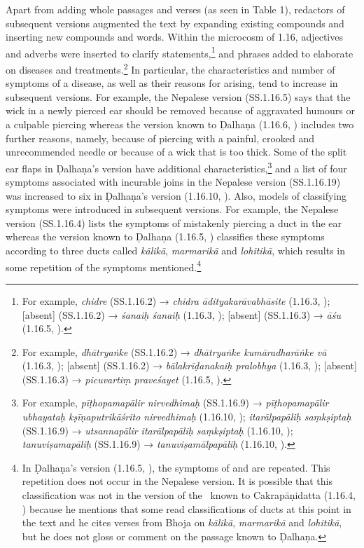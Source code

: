 Apart from adding whole passages and verses (as seen in Table 1), redactors of subsequent versions augmented the text by expanding existing compounds and inserting new compounds and words. Within the microcosm of 1.16, adjectives and adverbs were inserted to clarify statements,\footnote{For example, \emph{chidre} (SS.1.16.2) → \emph{chidra ādityakarāvabhāsite} (1.16.3, \cite[76]{vulgate}); [absent] (SS.1.16.2) → \emph{śanaiḥ śanaiḥ} (1.16.3, \cite[76]{vulgate});  [absent] (SS.1.16.3) → \emph{āśu} (1.16.5, \cite[77]{vulgate}).} and phrases added to elaborate on diseases and treatments.\footnote{For example, \emph{dhātryaṅke} (SS.1.16.2) → \emph{dhātryaṅke kumāradharāṅke vā} (1.16.3, \cite[76]{vulgate}); [absent] (SS.1.16.2) → \emph{bālakrīḍanakaiḥ pralobhya} (1.16.3, \cite[76]{vulgate});  [absent] (SS.1.16.3) → \emph{picuvartiṃ praveśayet} (1.16.5, \cite[77]{vulgate}).} In particular, the characteristics and number of symptoms of a disease, as well as their reasons for arising, tend to increase in subsequent versions. For example, the Nepalese version (SS.1.16.5) says that the wick in a newly pierced ear should be removed because of aggravated humours or a culpable piercing whereas the version known to Ḍalhaṇa (1.16.6, \cite[77]{vulgate}) includes two further reasons, namely, because of piercing with a painful, crooked and unrecommended needle or because of a wick that is too thick. Some of the split ear flaps in Ḍalhaṇa's version have additional characteristics,\footnote{For example, \emph{pīṭhopamapālir nirvedhimaḥ} (SS.1.16.9) → \emph{pīṭhopamapālir ubhayataḥ kṣīṇaputrikāśrito nirvedhimaḥ} (1.16.10, \cite[77]{vulgate}); \emph{itarālpapāliḥ saṃkṣiptaḥ} (SS.1.16.9) → \emph{utsannapālir itarālpapāliḥ saṃkṣiptaḥ} (1.16.10, \cite[77]{vulgate}); \emph{tanuviṣamapāliḥ} (SS.1.16.9) → \emph{tanuviṣamālpapāliḥ} (1.16.10, \cite[77]{vulgate}).} and a list of four symptoms associated with incurable joins in the Nepalese version (SS.1.16.19) was increased to six in Ḍalhaṇa's version (1.16.10, \cite[77]{vulgate}). Also, models of classifying symptoms were introduced in subsequent versions. For example, the Nepalese version (SS.1.16.4) lists the symptoms of mistakenly piercing a duct in the ear whereas the version known to Ḍalhaṇa (1.16.5, \cite[76–77]{vulgate}) classifies these symptoms according to three ducts called \emph{kālikā}, \emph{marmarikā} and \emph{lohitikā}, which results in some repetition of the symptoms mentioned.\footnote{In Ḍalhaṇa's version  (1.16.5, \cite[76–77]{vulgate}), the symptoms of  and  are repeated. This repetition does not occur in the Nepalese version. It is possible that this classification was not in the version of the \SS\ known to Cakrapāṇidatta (1.16.4, \cite[126]{acar-1939}) because he mentions that some read classifications of ducts at this point in the text and he cites verses from Bhoja on \emph{kālikā}, \emph{marmarikā} and \emph{lohitikā}, but he does not gloss or comment on the passage known to Ḍalhaṇa.}

